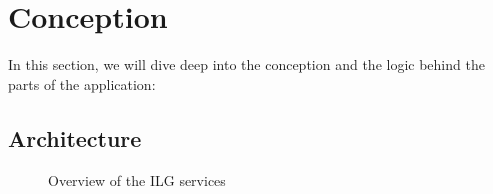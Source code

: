 \section{Conception}
In this section, we will dive deep into the conception and the logic behind the parts of the application:

\subsection{Architecture}
\begin{figure}[H]
	\centering
	\caption{Overview of the ILG services}
	\label{fig:services-overview}
\end{figure}

